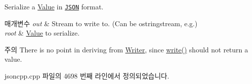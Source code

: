 Serialize a \hyperlink{class_json_1_1_value}{Value} in \href{http://www.json.org}{\tt J\+S\+ON} format. 


\begin{DoxyParams}{매개변수}
{\em out} & Stream to write to. (Can be ostringstream, e.\+g.) \\
\hline
{\em root} & \hyperlink{class_json_1_1_value}{Value} to serialize. \\
\hline
\end{DoxyParams}
\begin{DoxyNote}{주의}
There is no point in deriving from \hyperlink{class_json_1_1_writer}{Writer}, since \hyperlink{class_json_1_1_styled_stream_writer_a5d89d984fe675641e42c4370cd247774}{write()} should not return a value. 
\end{DoxyNote}


jsoncpp.\+cpp 파일의 4698 번째 라인에서 정의되었습니다.



